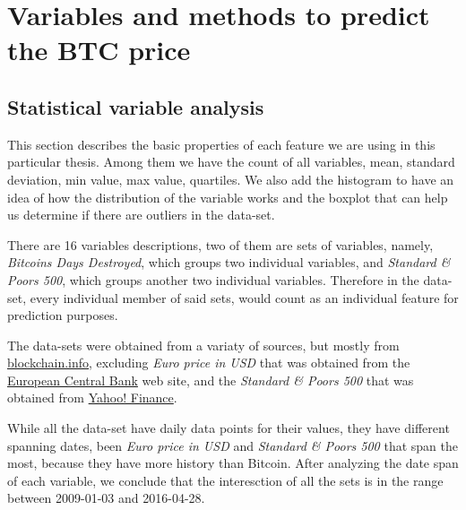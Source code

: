 
\chapter{Variables and methods to predict the BTC price} %

\label{ch:variables}


\section{Statistical variable analysis}
\label{sec:stat-var-analysis}

This section describes the basic properties of each feature we are
using in this particular thesis. Among them we have the count of all
variables, mean, standard deviation, min value, max value, quartiles.
We also add the histogram to have an idea of how the distribution of
the variable works and the boxplot that can help us determine if there
are outliers in the data-set.

There are 16 variables descriptions, two of them are sets of
variables, namely, \textit{Bitcoins Days Destroyed}, which groups two
individual variables, and \textit{Standard \& Poors 500}, which groups
another two individual variables. Therefore in the data-set, every
individual member of said sets, would count as an individual feature
for prediction purposes.

The data-sets were obtained from a variaty of sources, but mostly from
\href{https://blockchain.info/charts}{blockchain.info}, excluding
\textit{Euro price in USD} that was obtained from the
\href{https://www.ecb.europa.eu/stats/exchange/eurofxref/html/index.en.html}{European
  Central Bank} web site, and the \textit{Standard \& Poors 500} that
was obtained from
\href{https://finance.yahoo.com/q/hp?s=^GSPC\&a=00\&b=3\&c=1950\&d=05\&e=8\&f=2016\&g=d}{Yahoo!
  Finance}.

While all the data-set have daily data points for their values, they
have different spanning dates, been \textit{Euro price in USD} and
\textit{Standard \& Poors 500} that span the most, because they have
more history than Bitcoin. After analyzing the date span of each
variable, we conclude that the interesction of all the sets is in the
range between 2009-01-03 and 2016-04-28.


